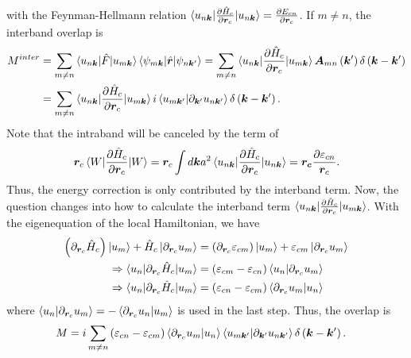 \documentclass[12pt, oneside]{article}
\newcommand{\pr}{\prime}
\newcommand{\pa}{\partial}
\newcommand{\p}[1]{\left(#1\right)}
\numberwithin{equation}{subsection}
\begin{document}
with the Feynman-Hellmann relation \(\braket{u_{n \bm{k}} | \frac{\pa \hat{H}_c}{\pa \bm{r}_c} | u_{n \bm{k}}} = \frac{\pa E_{cn}}{\pa \bm{r}_c}\). If \(m \neq n\), the interband overlap is
\begin{align}
	\begin{split}
		M^{inter} & = \sum_{m \neq n}  \braket{u_{n \bm{k}} | \hat{F} | u_{m \bm{k}}}  \braket{\psi_{m \bm{k}} | \hat{\bm{r}} | \psi_{n \bm{k}^\pr}} = \sum_{m \neq n}  \braket{u_{n \bm{k}} | \frac{\pa \hat{H}_c}{\pa \bm{r}_c} | u_{m \bm{k}}} \bm{A}_{mn} \p{\bm{k}^\pr} \delta \p{\bm{k} - \bm{k}^\pr} \\
		& = \sum_{m \neq n}  \braket{u_{n \bm{k}} | \frac{\pa \hat{H}_c}{\pa \bm{r}_c} | u_{m \bm{k}}} i \braket{u_{m \bm{k}^\pr} | \pa_{\bm{k}^\pr} u_{n \bm{k}^\pr}} \delta \p{\bm{k} - \bm{k}^\pr}.
	\end{split}
\end{align}
Note that the intraband will be canceled by the term of 
\begin{align}
	\bm{r}_{c} \braket{W | \frac{\pa \hat{H}_c}{\pa \bm{r}_c} | W} = \bm{r}_c \int d \bm{k} a^2 \braket{u_{n \bm{k}} | \frac{\pa \hat{H}_c}{\pa \bm{r}_c} | u_{n \bm{k}}} = \bm{r_{c}} \frac{\pa \varepsilon_{cn}}{\bm{r}_c}.
\end{align}
Thus, the energy correction is only contributed by the interband term. Now, the question changes into how to calculate the interband term \(\braket{u_{n \bm{k}} | \frac{\pa \hat{H}_c}{\pa \bm{r}_c} | u_{m \bm{k}}}\). With the eigenequation of the local Hamiltonian, we have
\begin{align}
	\begin{split}
		\p{\pa_{\bm{r}_c} \hat{H}_c} \ket{u_m} + \hat{H}_c \ket{\pa_{\bm{r}_c} u_m} &= \p{\pa_{\bm{r}_c} \varepsilon_{cm}} \ket{u_m} + \varepsilon_{cm} \ket{\pa_{\bm{r}_c} u_m} \\
		\Rightarrow \braket{u_n |  \pa_{\bm{r}_c} \hat{H}_c  | u_m} & = \p{\varepsilon_{cm} - \varepsilon_{cn}} \braket{u_n | \pa_{\bm{r}_c} u_m} \\ 
		\Rightarrow \braket{u_n | \pa_{\bm{r}_c} \hat{H}_c | u_m} & = \p{\varepsilon_{cn} - \varepsilon_{cm}} \braket{\pa_{\bm{r}_c} u_m | u_n}
	\end{split}
\end{align}
where \(\braket{u_n | \pa_{\bm{r}_c} u_m} = - \braket{\pa_{\bm{r}_c} u_n | u_m}\) is used in the last step. Thus, the overlap is 
\begin{align}
	\begin{split}
		M & = i \sum_{m \neq n} \p{\varepsilon_{cn} - \varepsilon_{cm}} \braket{\pa_{\bm{r}_c} u_m | u_n} \braket{u_{m \bm{k}^\pr} | \pa_{\bm{k}^\pr} u_{n \bm{k}^\pr}} \delta \p{\bm{k} - \bm{k}^\pr}.
	\end{split}
\end{align}
\end{document}
